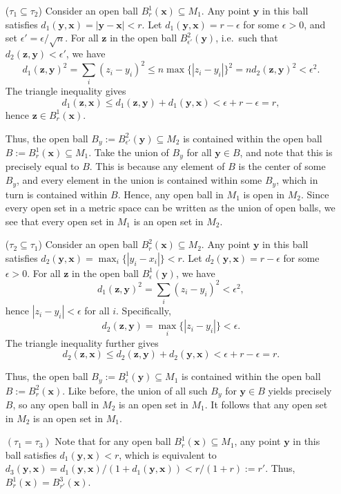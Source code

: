 \documentclass[11pt]{article}
\renewcommand\vec\boldsymbol
\def\vx{\vec{x}}
\def\vy{\vec{y}}
\def\vz{\vec{z}}
\theoremstyle{remark}
\begin{document}
    \begin{itemize}
    \item[($\tau_1 \subseteq \tau_2$)] 
    Consider an open ball $B^1_r(\vx) \subseteq M_1$. Any point $\vy$ in this ball
    satisfies $d_1(\vy, \vx) = |\vy - \vx| < r$.
    Let $d_1(\vy, \vx) = r - \epsilon$ for some $\epsilon > 0$, and set $\epsilon' =
    \epsilon / \sqrt{n}$. For all $\vz$ in the open ball $B^2_{\epsilon'}(\vy)$,
    i.e.\ such that $d_2(\vz, \vy) < \epsilon'$, we have \[
        d_1(\vz, \vy)^2 = \sum_i (z_i - y_i)^2 \leq n\max\{|z_i - y_i|\}^2 =
        nd_2(\vz, \vy)^2 < \epsilon^2.
    \] The triangle inequality gives \[
        d_1(\vz, \vx) \leq d_1(\vz, \vy) + d_1(\vy, \vx) < \epsilon + r - \epsilon = r,
    \] hence $\vz \in B^1_r(\vx)$.

    Thus, the open ball $B_y := B^2_{\epsilon'}(\vy) \subseteq M_2$ is contained
    within the open ball $B := B^1_r(\vx) \subseteq M_1$.  Take the union of $B_y$
    for all $\vy \in B$, and note that this is precisely equal to $B$. This is
    because any element of $B$ is the center of some $B_y$, and every element in the
    union is contained within some $B_y$, which in turn is contained within $B$.
    Hence, any open ball in $M_1$ is open in $M_2$. Since every open set in a metric
    space can be written as the union of open balls, we see that every open set in
    $M_1$ is an open set in $M_2$.

    \item[($\tau_2 \subseteq \tau_1$)]
    Consider an open ball $B^2_r(\vx) \subseteq M_2$. Any point $\vy$ in this ball
    satisfies $d_2(\vy, \vx) = \max_i\{|y_i - x_i|\} < r$. Let $d_2(\vy, \vx) = r -
    \epsilon$ for some $\epsilon > 0$. For all $\vz$ in the open ball
    $B^1_{\epsilon}(\vy)$, we have \[
        d_1(\vz, \vy)^2 = \sum_i (z_i - y_i)^2 < \epsilon ^2,
    \] hence $|z_i - y_i| < \epsilon$ for all $i$.  Specifically, \[
        d_2(\vz, \vy) = \max_i\{|z_i - y_i|\} < \epsilon.
    \] The triangle inequality further gives \[
        d_2(\vz, \vx) \leq d_2(\vz, \vy) + d_2(\vy, \vx) < \epsilon + r - \epsilon =
        r.
    \]

    Thus, the open ball $B_y := B^1_\epsilon(\vy) \subseteq M_1$ is contained within
    the open ball $B := B^2_r(\vx)$. Like before, the union of all such $B_y$ for
    $\vy \in B$ yields precisely $B$, so any open ball in $M_2$ is an open set in
    $M_1$. It follows that any open set in $M_2$ is an open set in $M_1$.
    
    \item[$(\tau_1 = \tau_3)$] Note that for any open ball $B^1_r(\vx) \subseteq
    M_1$, any point $\vy$ in this ball satisfies $d_1(\vy, \vx) < r$, which is
    equivalent to $d_3(\vy, \vx) = d_1(\vy, \vx) / (1 + d_1(\vy, \vx)) < r / (1 + r)
    := r'$. Thus, $B^1_r(\vx) = B^3_{r'}(\vx)$.


\end{itemize}
\end{document}

